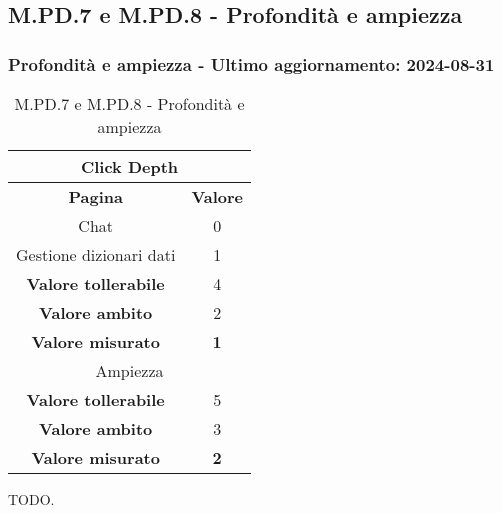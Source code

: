 \subsection{M.PD.7 e M.PD.8 - Profondità e ampiezza}

\subsubsection*{Profondità e ampiezza - Ultimo aggiornamento: 2024-08-31}

\begin{table}[H]
  \centering
  \begin{tabular}{|c|c|}
      \hline
      \multicolumn{2}{|c|}{Click Depth} \\
      \hline
      \textbf{Pagina} & \textbf{Valore} \\
      \hline
      Chat & 0 \\
      \hline 
      Gestione dizionari dati & 1 \\
      \hline
      \textbf{Valore tollerabile} & 4 \\
      \hline
      \textbf{Valore ambito} & 2 \\
      \hline
      \textbf{Valore misurato} & \textbf{1} \\
      \hline
      \multicolumn{2}{|c|}{Ampiezza} \\
      \hline
      \textbf{Valore tollerabile} & 5 \\
      \hline
      \textbf{Valore ambito} & 3 \\
      \hline
      \textbf{Valore misurato} & \textbf{2} \\
      \hline 
  \end{tabular}
  \caption{M.PD.7 e M.PD.8 - Profondità e ampiezza}
\end{table}

\par TODO.